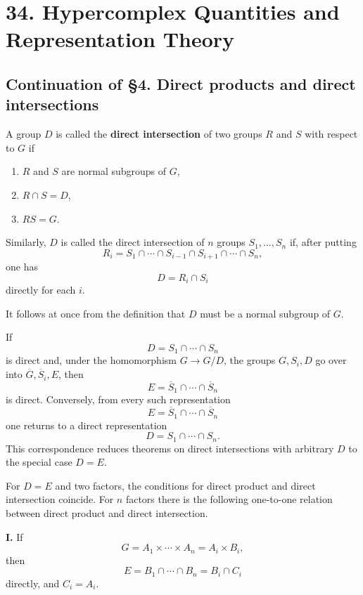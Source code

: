 \documentclass[
  11pt,
]{article}
\author{}
\date{}
\begin{document}
\section{34. Hypercomplex Quantities and Representation
Theory}\label{hypercomplex-quantities-and-representation-theory}

\subsection{Continuation of §4. Direct products and direct
intersections}\label{continuation-of-4.-direct-products-and-direct-intersections}

A group \(D\) is called the \textbf{direct intersection} of two groups
\(R\) and \(S\) with respect to \(G\) if

\begin{enumerate}
\def\labelenumi{\alph{enumi})}
\item
  \(R\) and \(S\) are normal subgroups of \(G\),
\item
  \(R\cap S=D\),
\item
  \(RS=G\).
\end{enumerate}

Similarly, \(D\) is called the direct intersection of \(n\) groups
\(S_1,\ldots,S_n\) if, after putting \[
  R_i=S_1\cap\cdots\cap S_{i-1}\cap S_{i+1}\cap\cdots\cap S_n,
\] one has \[
  D=R_i\cap S_i
\] directly for each \(i\).

It follows at once from the definition that \(D\) must be a normal
subgroup of \(G\).

If \[
  D=S_1\cap\cdots\cap S_n
\] is direct and, under the homomorphism \(G\to G/D\), the groups
\(G,S_i,D\) go over into \(\overline G,\overline S_i,E\), then \[
  E=\overline S_1\cap\cdots\cap\overline S_n
\] is direct. Conversely, from every such representation \[
  E=\overline S_1\cap\cdots\cap\overline S_n
\] one returns to a direct representation \[
  D=S_1\cap\cdots\cap S_n.
\] This correspondence reduces theorems on direct intersections with
arbitrary \(D\) to the special case \(D=E\).

For \(D=E\) and two factors, the conditions for direct product and
direct intersection coincide. For \(n\) factors there is the following
one-to-one relation between direct product and direct intersection.

\textbf{I.} If \[
  G=A_1\times\cdots\times A_n=A_i\times B_i,
\] then \[
  E=B_1\cap\cdots\cap B_n=B_i\cap C_i
\] directly, and \(C_i=A_i\).
\end{document}
